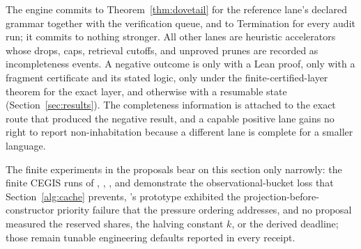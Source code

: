 \begin{decision}\label{dec:commitment}
The engine commits to Theorem~\ref{thm:dovetail} for the reference lane's declared grammar together with the verification queue, and to Termination for every audit run; it commits to nothing stronger. All other lanes are heuristic accelerators whose drops, caps, retrieval cutoffs, and unproved prunes are recorded as incompleteness events. A negative outcome is  only with a Lean proof,  only with a fragment certificate and its stated logic,  only under the finite-certified-layer theorem for the exact layer, and otherwise  with a resumable state (Section~\ref{sec:results}). The completeness information is attached to the exact route that produced the negative result, and a capable positive lane gains no right to report non-inhabitation because a different lane is complete for a smaller language.
\end{decision}

The finite experiments in the proposals bear on this section only narrowly: the finite CEGIS runs of , , , and  demonstrate the observational-bucket loss that Section~\ref{alg:cache} prevents, 's prototype exhibited the projection-before-constructor priority failure that the pressure ordering addresses, and no proposal measured the reserved shares, the halving constant $k$, or the derived deadline; those remain tunable engineering defaults reported in every receipt.
